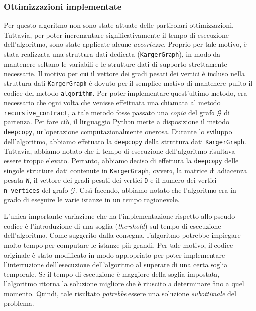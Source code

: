 \subsubsection{Ottimizzazioni implementate}
Per questo algoritmo non sono state attuate delle particolari ottimizzazioni. Tuttavia, 
per poter incrementare significativamente il tempo di esecuzione dell'algoritmo, sono 
state applicate alcune \textit{accortezze}. Proprio per tale motivo, è stata realizzata 
una struttura dati dedicata (\verb|KargerGraph|), in modo da mantenere soltano le 
variabili e le strutture dati di supporto strettamente necessarie. Il motivo per cui il 
vettore dei gradi pesati dei vertici è incluso nella struttura dati \verb|KargerGraph| 
è dovuto per il semplice motivo di mantenere pulito il codice del metodo 
\verb|algorithm|. Per poter implementare quest'ultimo metodo, era necessario che ogni 
volta che venisse effettuata una chiamata al metodo \verb|recursive_contract|, a 
tale metodo fosse passato una \textit{copia} del grafo $\mathcal{G}$ di partenza. 
Per fare ciò, il linguaggio Python mette a disposizione il metodo \verb|deepcopy|, 
un'operazione computazionalmente onerosa. Durante lo sviluppo dell'algoritmo, abbiamo 
effetuato la \verb|deepcopy| della struttura dati \verb|KargerGraph|. Tuttavia, abbiamo 
notato che il tempo di esecuzione dell'algoritmo risultava essere troppo elevato. 
Pertanto, abbiamo deciso di effettura la \verb|deepcopy| delle singole strutture dati 
contenute in \verb|KargerGraph|, ovvero, la matrice di adiacenza pesata \verb|W|, il 
vettore dei gradi pesati dei vertici \verb|D| e il numero dei vertici \verb|n_vertices|
del grafo $\mathcal{G}$. Così facendo, abbiamo notato che l'algoritmo era in grado di 
eseguire le varie istanze in un tempo ragionevole.

L'unica importante variazione che ha l'implementazione rispetto allo pseudo-codice è 
l'introduzione di una soglia (\textit{thershold}) sul tempo di esecuzione dell'algoritmo. 
Come suggerito dalla consegna, l'algoritmo potrebbe impiegare molto tempo per computare 
le istanze più grandi. Per tale motivo, il codice originale è stato modificato in modo 
appropriato per poter implementare l'interruzione dell'esecuzione dell'algoritmo al 
superare di una certa soglia temporale. Se il tempo di esecuzione è maggiore della 
soglia impostata, l'algoritmo ritorna la soluzione migliore che è riuscito a determinare 
fino a quel momento. Quindi, tale risultato \textit{potrebbe} essere una soluzione 
\textit{subottimale} del problema.
